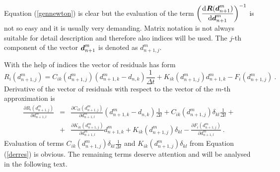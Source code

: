 \documentclass[12pt]{book}
\newcommand{\mbf}[1]{\mbox{\boldmath$#1$}}
\newcommand{\del}[2]{\mbox{$\displaystyle\frac{#1}{#2}$}}
\newcommand{\ppd}[2]{\del{\partial{#1}}{\partial{#2}}}
\newcommand{\od}[2]{\del{{\rm d}\>\!{#1}}{{\rm d}{#2}}}
\begin{document}
Equation (\ref{gennewton}) is clear but the evaluation of the term
$\left(\od{\mbf{R}(\mbf{d}_{n+1}^{m})}{\mbf{d}_{n+1}^{m}}\right)^{-1}$ is not so easy and it is usually very demanding.
Matrix notation is not always suitable for detail description and therefore also indices will be used.
The $j$-th component of the vector $\mbf{d}_{n+1}^{m}$ is denoted as $d_{n+1,j}^{m}$.

With the help of indices the vector of residuals has form
\begin{equation}
R_{i}(d_{n+1,j}^{m}) = C_{ik}(d_{n+1,j}^{m}) \left(d_{n+1,k}^{m} - d_{n,k}\right)\del{1}{\Delta t} +
K_{ik}(d_{n+1,j}^{m}) d_{n+1,k}^{m} - F_i(d_{n+1,j}^{m}) \ .
\end{equation}
Derivative of the vector of residuals with respect to the vector of the $m$-th approximation is
\begin{eqnarray}\label{derres}
\ppd{R_{i}(d_{n+1,j}^{m})}{d_{n+1,l}^{m}} &=&
\ppd{C_{ik}(d_{n+1,j}^{m})}{d_{n+1,l}^{m}} \left(d_{n+1,k}^{m} - d_{n,k}\right)\del{1}{\Delta t} +
C_{ik}(d_{n+1,j}^{m}) \delta_{kl}\del{1}{\Delta t} +
\\ \nonumber
&+&
\ppd{K_{ik}(d_{n+1,j}^{m})}{d_{n+1,l}^{m}} d_{n+1,k}^{m} + K_{ik}(d_{n+1,j}^{m}) \delta_{kl} - 
\ppd{F_i(d_{n+1,j}^{m})}{d_{n+1,l}^{m}} \ .
\end{eqnarray}
Evaluation of terms $C_{ik}(d_{n+1,j}^{m}) \delta_{kl}\del{1}{\Delta t}$ and $K_{ik}(d_{n+1,j}^{m}) \delta_{kl}$
from Equation (\ref{derres}) is obvious. The remaining terms deserve attention and will be analysed in the following
text.
\end{document}
